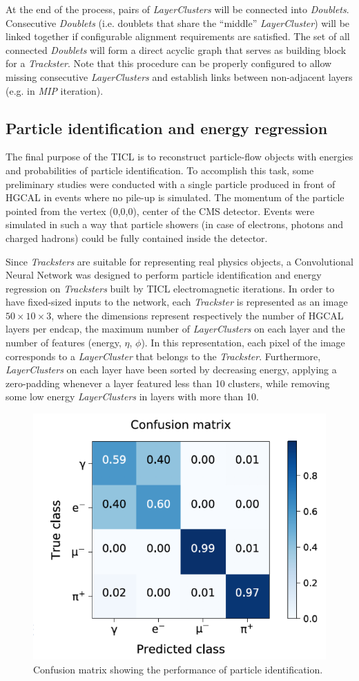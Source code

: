 At the end of the process, pairs of \emph{LayerClusters} will be connected into \emph{Doublets}. Consecutive \emph{Doublets} (i.e. doublets that share the ``middle'' \emph{LayerCluster}) will be linked together if configurable alignment requirements are satisfied. The set of all connected \emph{Doublets} will form a direct acyclic graph that serves as building block for a \emph{Trackster}. Note that this procedure can be properly configured to allow missing consecutive \emph{LayerClusters} and establish links between non-adjacent layers (e.g. in \emph{MIP} iteration). 





\subsection{Particle identification and energy regression}
\label{sec:pid}
The final purpose of the TICL is to reconstruct particle-flow objects with energies and probabilities of particle identification. To accomplish this task, some preliminary studies were conducted with a single particle produced in front of HGCAL in events where no pile-up is simulated. The momentum of the particle pointed from the vertex (0,0,0), center of the CMS detector. Events were simulated in such a way that particle showers (in case of electrons, photons and charged hadrons) could be fully contained inside the detector.

Since \emph{Tracksters} are suitable for representing real physics objects, a Convolutional Neural Network was designed to perform particle identification and energy regression on \emph{Tracksters} built by TICL electromagnetic iterations. In order to have fixed-sized inputs to the network, each \emph{Trackster} is represented as an image $50 \times 10 \times 3$, where the dimensions represent respectively the number of HGCAL layers per endcap, the maximum number of \emph{LayerClusters} on each layer and the number of features (energy, $\eta$, $\phi$). In this representation, each pixel of the image corresponds to a \emph{LayerCluster} that belongs to the \emph{Trackster}. Furthermore, \emph{LayerClusters} on each layer have been sorted by decreasing energy, applying a zero-padding whenever a layer featured less than 10 clusters, while removing some low energy \emph{LayerClusters} in layers with more than 10.

\begin{figure}[t]
    \centering
    \includegraphics[width=.4\textwidth]{chapters/HGCal/figures/chef/pid}
    \caption{\label{fig:pid} Confusion matrix showing the performance of particle identification.}
\end{figure}

